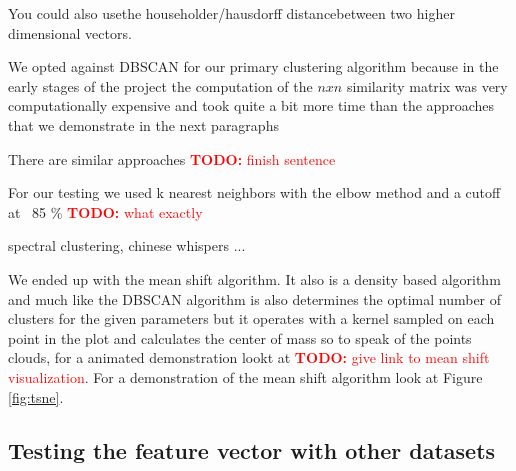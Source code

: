\documentclass[journal]{vgtc}       %
\newcommand{\todo}[1]{\textcolor{red}{\textbf{TODO:} #1}}
\begin{document}
You could also usethe householder/hausdorff distancebetween two higher dimensional vectors.

We opted against DBSCAN for our primary clustering algorithm because in the early stages of the project the computation of the \(nxn\) similarity matrix was very computationally expensive and took quite a bit more time than the approaches that we demonstrate in the next paragraphs

There are similar approaches \todo{finish sentence}

For our testing we used k nearest neighbors with the elbow method and a cutoff at  ~85 \% \todo{what exactly}

spectral clustering, chinese whispers  ... 

We ended up with the mean shift algorithm. It also is a density based algorithm and much like the DBSCAN algorithm is also determines the optimal number of clusters for the given parameters but it operates with a kernel sampled on each point in the plot and calculates the center of mass so to speak of the points clouds, for a animated demonstration lookt at \todo{give link to mean shift visualization}. For a demonstration of the mean shift algorithm look at Figure \ref{fig:tsne}. 




\subsection{Testing the feature vector with other datasets}
\end{document}

